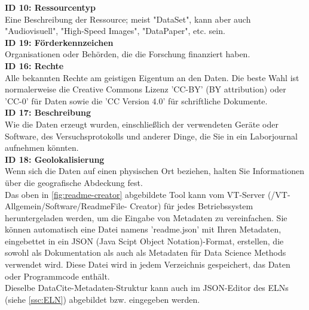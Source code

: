 %
\textbf{ID 10: Ressourcentyp} \\
Eine Beschreibung der Ressource; meist "DataSet", kann aber auch "Audiovisuell",
"High-Speed Images", "DataPaper", etc. sein.\\[6pt]
%
\textbf{ID 19: Förderkennzeichen} \\
Organisationen oder Behörden, die die Forschung finanziert haben. \\[6pt]
%
\textbf{ID 16: Rechte} \\
Alle bekannten Rechte am geistigen Eigentum an den Daten. Die beste Wahl ist
normalerweise die Creative Commons Lizenz 'CC-BY' (BY attribution) oder 'CC-0'
für Daten sowie die 'CC Version 4.0' für schriftliche Dokumente. \\[6pt]
%
\textbf{ID 17: Beschreibung} \\
Wie die Daten erzeugt wurden, einschließlich der verwendeten Geräte oder
Software, des Versuchsprotokolls und anderer Dinge, die Sie in ein Laborjournal
aufnehmen könnten. \\[6pt]
%
\textbf{ID 18: Geolokalisierung} \\
Wenn sich die Daten auf einen physischen Ort beziehen, halten Sie Informationen
über die geografische Abdeckung fest. \\[6pt]
%
Das oben in \autoref{fig:readme-creator} abgebildete Tool kann vom VT-Server (/VT-Allgemein/Software/ReadmeFile- Creator) für jedes Betriebssystem  heruntergeladen werden, um die Eingabe von Metadaten zu vereinfachen. Sie  können automatisch eine Datei namens 'readme.json' mit Ihren Metadaten, eingebettet in ein JSON (Java Scipt Object Notation)-Format, erstellen, die sowohl als Dokumentation als auch als Metadaten für Data Science Methods verwendet wird. Diese Datei wird in jedem Verzeichnis gespeichert, das Daten oder Programmcode enthält.\\
%
Dieselbe DataCite-Metadaten-Struktur kann auch im JSON-Editor des ELNs (siehe \ref{ssc:ELN}) abgebildet bzw. eingegeben werden.
